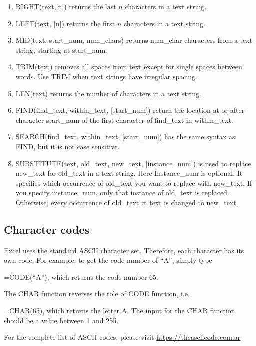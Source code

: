 \documentclass[
]{article}
\theoremstyle{definition}
\theoremstyle{definition}
\theoremstyle{definition}
\theoremstyle{definition}
\theoremstyle{remark}
\begin{document}
\begin{enumerate}
\def\labelenumi{\arabic{enumi}.}
\item
  RIGHT(text,{[}n{]}) returns the last \(n\) characters in a text string.
\item
  LEFT(text, {[}n{]}) returns the first \(n\) characters in a text string.
\item
  MID(text, start\_num, num\_chars) returns num\_char characters from a
  text string, starting at start\_num.
\item
  TRIM(text) removes all spaces from text except for single spaces
  between words. Use TRIM when text strings have irregular spacing.
\item
  LEN(text) returns the number of characters in a text string.
\item
  FIND(find\_text, within\_text, {[}start\_num{]}) return the location at
  or after character start\_num of the first character of find\_text in
  within\_text.
\item
  SEARCH(find\_text, within\_text, {[}start\_num{]}) has the same syntax as
  FIND, but it is not case sensitive.
\item
  SUBSTITUTE(text, old\_text, new\_text, {[}instance\_num{]}) is used to
  replace new\_text for old\_text in a text string. Here Instance\_num is
  optional. It specifies which occurrence of old\_text you want to
  replace with new\_text. If you specify instance\_num, only that
  instance of old\_text is replaced. Otherwise, every occurrence of
  old\_text in text is changed to new\_text.
\end{enumerate}

\hypertarget{character-codes}{%
\subsection{Character codes}\label{character-codes}}

Excel uses the standard ASCII character set. Therefore, each character
has its own code. For example, to get the code number of ``A'', simply
type

=CODE(``A''), which returns the code number 65.

The CHAR function reverses the role of CODE function, i.e.

=CHAR(65), which returns the letter A. The input for the CHAR function
should be a value between 1 and 255.

For the complete list of ASCII codes, please visit
\url{https://theasciicode.com.ar}
\end{document}
